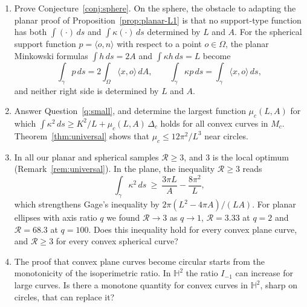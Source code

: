 \documentclass[11pt]{amsart}
\theoremstyle{definition}
\theoremstyle{remark}
\numberwithin{equation}{section}
\newcommand{\HH}{\mathbb{H}}
\begin{document}
\begin{enumerate}[label=\textup{(\arabic*)}]
\item Prove Conjecture~\ref{conj:sphere}. On the sphere, the obstacle to adapting the planar proof of Proposition~\ref{prop:planar-L1} is that no support-type function has both $\int(\cdot)\,ds$ and $\int\kappa(\cdot)\,ds$ determined by $L$ and $A$. For the spherical support function $p=\langle o,n\rangle$ with respect to a point $o\in\Omega$, the planar Minkowski formulas $\int h\,ds=2A$ and $\int\kappa h\,ds=L$ become
\[
\int_\gamma p\,ds=2\int_\Omega\langle x,o\rangle\,dA,\qquad \int_\gamma\kappa p\,ds=\int_\gamma\langle x,o\rangle\,ds,
\]
and neither right side is determined by $L$ and $A$.
\item Answer Question~\ref{q:small}, and determine the largest function $\mu_c(L,A)$ for which $\int\kappa^2\,ds\ge K^2/L+\mu_c(L,A)\,\Delta_c$ holds for all convex curves in $M_c$. Theorem~\ref{thm:universal} shows that $\mu_c\le12\pi^2/L^3$ near circles.
\item In all our planar and spherical samples $\mathcal R\ge3$, and $3$ is the local optimum (Remark~\ref{rem:universal}). In the plane, the inequality $\mathcal R\ge3$ reads
\[
\int_\gamma\kappa^2\,ds\ \ge\ \frac{3\pi L}{A}-\frac{8\pi^2}{L},
\]
which strengthens Gage's inequality by $2\pi(L^2-4\pi A)/(LA)$. For planar ellipses with axis ratio $q$ we found $\mathcal R\to3$ as $q\to1$, $\mathcal R=3.33$ at $q=2$ and $\mathcal R=68.3$ at $q=100$. Does this inequality hold for every convex plane curve, and $\mathcal R\ge3$ for every convex spherical curve?
\item The proof that convex plane curves become circular \cite{Ga84,GH86} starts from the monotonicity of the isoperimetric ratio. In $\HH^2$ the ratio $I_{-1}$ can increase for large curves. Is there a monotone quantity for convex curves in $\HH^2$, sharp on circles, that can replace it?
\end{enumerate}
\end{document}
